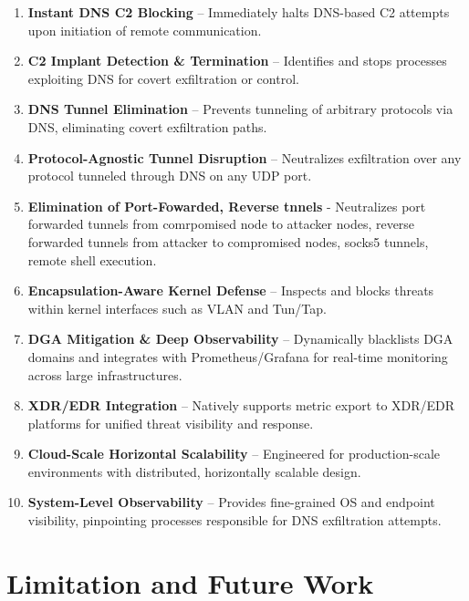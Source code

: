 \documentclass [11pt, proquest] {uwthesis}[2020/02/24]
\begin{document}
\begin{enumerate}[itemsep=1pt,parsep=0pt]
    \item \textbf{Instant DNS C2 Blocking} – Immediately halts DNS-based C2 attempts upon initiation of remote communication.

    \item \textbf{C2 Implant Detection \& Termination} – Identifies and stops processes exploiting DNS for covert exfiltration or control.

    \item \textbf{DNS Tunnel Elimination} – Prevents tunneling of arbitrary protocols via DNS, eliminating covert exfiltration paths.

    \item \textbf{Protocol-Agnostic Tunnel Disruption} – Neutralizes exfiltration over any protocol tunneled through DNS on any UDP port.

    \item \textbf{Elimination of Port-Fowarded, Reverse tnnels} - Neutralizes port forwarded tunnels from comrpomised node to attacker nodes, reverse forwarded tunnels from attacker to compromised nodes, socks5 tunnels, remote shell execution.

    \item \textbf{Encapsulation-Aware Kernel Defense} – Inspects and blocks threats within kernel interfaces such as VLAN and Tun/Tap.

    \item \textbf{DGA Mitigation \& Deep Observability} – Dynamically blacklists DGA domains and integrates with Prometheus/Grafana for real-time monitoring across large infrastructures.

    \item \textbf{XDR/EDR Integration} – Natively supports metric export to XDR/EDR platforms for unified threat visibility and response.

    \item \textbf{Cloud-Scale Horizontal Scalability} – Engineered for production-scale environments with distributed, horizontally scalable design.

    \item \textbf{System-Level Observability} – Provides fine-grained OS and endpoint visibility, pinpointing processes responsible for DNS exfiltration attempts.
\end{enumerate}


\section{Limitation and Future Work}
\end{document}
